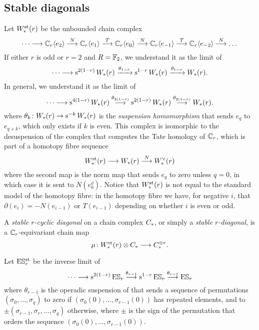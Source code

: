 \subsection{Stable diagonals}\label{s:stable}

Let $W^{\mathrm{st}}_{*}(r)$ be the unbounded chain complex
\[
\dotsb \longrightarrow \mathbb{C}_r\langle e_2\rangle \overset{N}{\longrightarrow}
\mathbb{C}_r\langle e_1\rangle \overset{T}{\longrightarrow}
\mathbb{C}_r\langle e_0\rangle \overset{N}{\longrightarrow}
\mathbb{C}_r\langle e_{-1}\rangle \overset{T}{\longrightarrow}
\mathbb{C}_r\langle e_{-2}\rangle \overset{N}{\longrightarrow}
\dots
\]
If either $r$ is odd or $r=2$ and $R=\mathbb{F}_2$, we understand it as the limit of
\[
\dotsb \longrightarrow \operatorname{s}^{2(1-r)}W_{*}(r) \xrightarrow{\theta_{1-r}} \operatorname{s}^{1-r} W_{*}(r) \xrightarrow{\theta_{1-r}} W_{*}(r).
\]
In general, we understand it as the limit of
\[
\dotsb \longrightarrow \operatorname{s}^{4(1-r)}W_{*}(r)\overset{\theta_{2(1-r)}}{\longrightarrow} \operatorname{s}^{2(1-r)} W_{*}(r) \overset{\theta_{2(1-r)}}{\longrightarrow} W_{*}(r).
\]
where $\theta_{k} \colon W_{*}(r) \to \operatorname{s}^{-k} W_{*}(r)$ is the \emph{suspension homomorphism} that sends $e_{q}$ to $e_{q+k}$, which only exists if $k$ is even.
This complex is isomorphic to the desuspension of the complex that computes the Tate homology of $\mathbb{C}_r$, which is part of a homotopy fibre sequence
\[
W^{\mathrm{st}}_{*}(r) \longrightarrow W_{*}(r)\overset{N}{\longrightarrow} W^\vee_{*}(r)
\]
where the second map is the norm map that sends $e_q$ to zero unless $q=0$, in which case it is sent to $N(e_0^\dd)$.
Notice that $W^{\mathrm{st}}_{*}(r)$ is not equal to the standard model of the homotopy fibre: in the homotopy fibre we have, for negative $i$, that $\partial(e_i) = -N(e_{i-1})$ or $T(e_{i-1})$ depending on whether $i$ is even or odd.

\begin{definition}
	A \emph{stable $r$-cyclic diagonal} on a chain complex $C_{*}$, or simply a \textit{stable $r$-diagonal}, is a $\mathbb{C}_r$-equivariant chain map
	\[
	\mu \colon W^{\mathrm{st}}_{*}(r) \otimes C_{*} \longrightarrow C_{*}^{\otimes r}.
	\]
\end{definition}

\begin{definition}
	Let $\mathrm{E}\mathbb{S}^{\mathrm{st}}_r$ be the inverse limit of
	\[
	\dotsb \longrightarrow \operatorname{s}^{2(1-r)} \mathrm{E}\mathbb{S}_r\overset{\theta_{r-1}}{\longrightarrow}\operatorname{s}^{1-r} \mathrm{E}\mathbb{S}_r\overset{\theta_{r-1}}{\longrightarrow} \mathrm{E}\mathbb{S}_r
	\]
	where $\theta_{r-1}$ is the operadic suspension of \cite{berger2004combinatorial} that sends a sequence of permutations $(\sigma_0,\dots,\sigma_q)$ to zero if $(\sigma_0(0),\dots,\sigma_{r-1}(0))$ has repeated elements, and to $\pm (\sigma_{r-1},\sigma_r,\dots,\sigma_q)$ otherwise, where $\pm$ is the sign of the permutation that orders the sequence $(\sigma_0(0),\dots,\sigma_{r-1}(0))$.
\end{definition}

